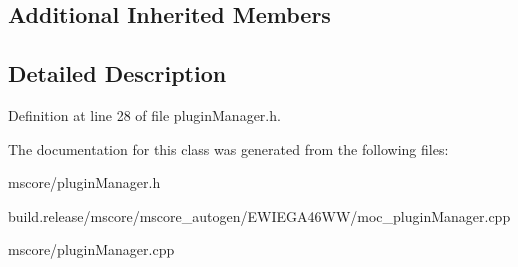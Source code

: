 \subsection*{Additional Inherited Members}


\subsection{Detailed Description}


Definition at line 28 of file plugin\+Manager.\+h.



The documentation for this class was generated from the following files\+:\begin{DoxyCompactItemize}
\item 
mscore/plugin\+Manager.\+h\item 
build.\+release/mscore/mscore\+\_\+autogen/\+E\+W\+I\+E\+G\+A46\+W\+W/moc\+\_\+plugin\+Manager.\+cpp\item 
mscore/plugin\+Manager.\+cpp\end{DoxyCompactItemize}

